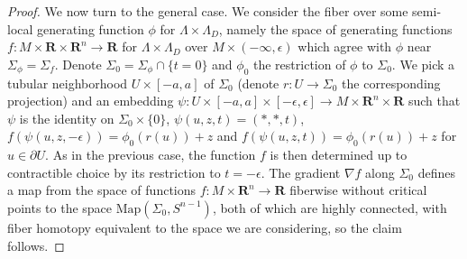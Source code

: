 \documentclass[10pt,a4paper]{amsart}
\newcommand{\Map}{\mathrm{Map}}
\newcommand{\R}{\mathbf{R}}
\newcommand{\del}{\partial}
\begin{document}
\begin{proof}
We now turn to the general case. We consider the fiber over some semi-local generating function $\phi$ for $\Lambda\times \Lambda_D$,
namely the space of generating functions $f:M\times \R\times \R^n\to \R$ for $\Lambda\times \Lambda_D$ over $M\times (-\infty, \epsilon)$
which agree with $\phi$ near $\Sigma_\phi=\Sigma_f$. Denote $\Sigma_0=\Sigma_\phi\cap\{t=0\}$ and $\phi_0$ the restriction of $\phi$ to $\Sigma_0$.
We pick a tubular neighborhood $U\times [-a,a]$ of $\Sigma_0$ (denote $r:U\to \Sigma_0$ the corresponding projection) and
an embedding $\psi:U\times[-a,a]\times[-\epsilon,\epsilon]\to M\times \R^n\times \R$ such that
$\psi$ is the identity on $\Sigma_0\times\{0\}$, $\psi(u,z,t)=(*,*,t)$, $f(\psi(u,z,-\epsilon))=\phi_0(r(u))+z$ and $f(\psi(u,z,t))=\phi_0(r(u))+z$ for $u\in \del U$.
As in the previous case, the function $f$ is then determined up to contractible choice by its restriction to $t=-\epsilon$. The gradient $\nabla f$
along $\Sigma_0$ defines a map from the space of functions $f:M\times \R^n\to \R$ fiberwise without critical points to
the space $\Map(\Sigma_0, S^{n-1})$, both of which are highly connected, with fiber homotopy equivalent to the space we are considering, so the claim follows.
\end{proof}
\end{document}
